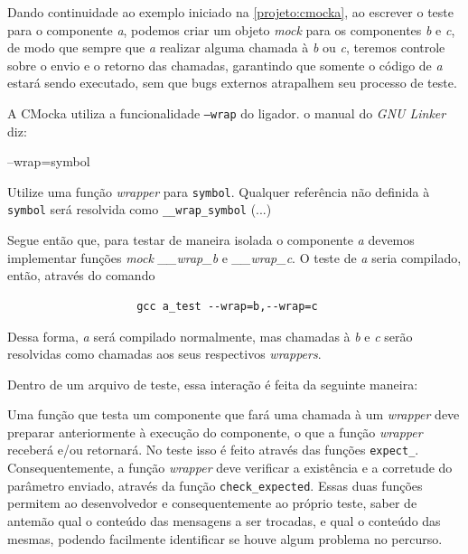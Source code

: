                 Dando continuidade ao exemplo iniciado na \autoref{projeto:cmocka}, ao escrever o teste para o componente \textit{a}, podemos criar um objeto \textit{mock} para os componentes \textit{b} e \textit{c}, de modo que sempre que \textit{a} realizar alguma chamada à \textit{b} ou \textit{c}, teremos controle sobre o envio e o retorno das chamadas, garantindo que somente o código de \textit{a} estará sendo executado, sem que bugs externos atrapalhem seu processo de teste.
                
                A CMocka utiliza a funcionalidade \texttt{--wrap} do ligador.
                o manual do \textit{GNU Linker} diz:
                
                \begin{citacao}
                --wrap=symbol
                
                \hspace{1,2cm}Utilize uma função \textit{wrapper} para \texttt{symbol}. Qualquer referência não definida à \texttt{symbol} será resolvida como \texttt{\_\_wrap\_symbol} (...)
                
                \cite{gnu-ld}
                \end{citacao}
                
                Segue então que, para testar de maneira isolada o componente \textit{a} devemos implementar funções \textit{mock} \textit{\_\_wrap\_b} e \textit{\_\_wrap\_c}. O teste de \textit{a} seria compilado, então, através do comando
                
                \begin{verbatim}
                    gcc a_test --wrap=b,--wrap=c
                \end{verbatim}
                
                Dessa forma, \textit{a} será compilado normalmente, mas chamadas à \textit{b} e \textit{c} serão resolvidas como chamadas aos seus respectivos \textit{wrappers}.
                
                Dentro de um arquivo de teste, essa interação é feita da seguinte maneira:
                
                Uma função que testa um componente que fará uma chamada à um \textit{wrapper} deve preparar anteriormente à execução do componente, o que a função \textit{wrapper} receberá e/ou retornará. No teste isso é feito através das funções \texttt{expect\_}. Consequentemente, a função \textit{wrapper} deve verificar a existência e a corretude do parâmetro enviado, através da função \texttt{check\_expected}. Essas duas funções permitem ao desenvolvedor e consequentemente ao próprio teste, saber de antemão qual o conteúdo das mensagens a ser trocadas, e qual o conteúdo das mesmas, podendo facilmente identificar se houve algum problema no percurso.
                
